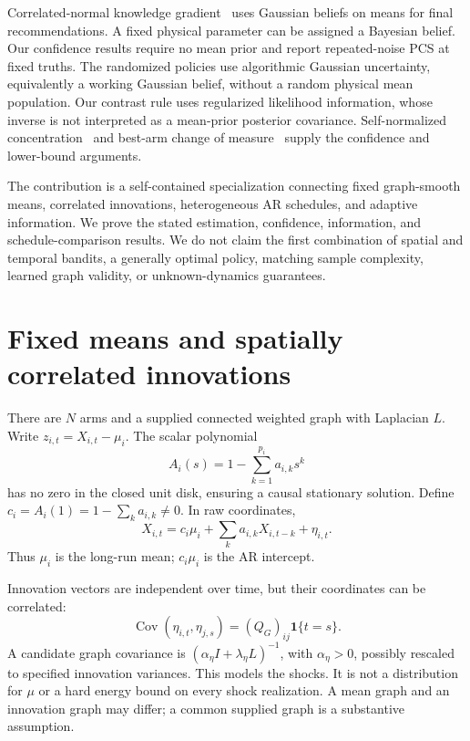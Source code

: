 \documentclass[11pt]{article}
\newcommand{\Cov}{\operatorname{Cov}}
\newcommand{\one}{\mathbf1}
\begin{document}
Correlated-normal knowledge gradient~\cite{frazier2009} uses Gaussian beliefs on means for final recommendations. A fixed physical parameter can be assigned a Bayesian belief. Our confidence results require no mean prior and report repeated-noise PCS at fixed truths. The randomized policies use algorithmic Gaussian uncertainty, equivalently a working Gaussian belief, without a random physical mean population. Our contrast rule uses regularized likelihood information, whose inverse is not interpreted as a mean-prior posterior covariance. Self-normalized concentration~\cite{abbasi2011} and best-arm change of measure~\cite{combes2017,garivier2016} supply the confidence and lower-bound arguments.

The contribution is a self-contained specialization connecting fixed graph-smooth means, correlated innovations, heterogeneous AR schedules, and adaptive information. We prove the stated estimation, confidence, information, and schedule-comparison results. We do not claim the first combination of spatial and temporal bandits, a generally optimal policy, matching sample complexity, learned graph validity, or unknown-dynamics guarantees.

\section{Fixed means and spatially correlated innovations}
There are $N$ arms and a supplied connected weighted graph with Laplacian $L$. Write $z_{i,t}=X_{i,t}-\mu_i$. The scalar polynomial
\[
A_i(s)=1-\sum_{k=1}^{p_i}a_{i,k}s^k
\]
has no zero in the closed unit disk, ensuring a causal stationary solution. Define $c_i=A_i(1)=1-\sum_k a_{i,k}\ne0$. In raw coordinates,
\begin{equation}
X_{i,t}=c_i\mu_i+\sum_k a_{i,k}X_{i,t-k}+\eta_{i,t}.
\end{equation}
Thus $\mu_i$ is the long-run mean; $c_i\mu_i$ is the AR intercept.

Innovation vectors are independent over time, but their coordinates can be correlated:
\begin{equation}
\Cov(\eta_{i,t},\eta_{j,s})=(Q_G)_{ij}\one\{t=s\}.
\end{equation}
A candidate graph covariance is $(\alpha_\eta I+\lambda_\eta L)^{-1}$, with $\alpha_\eta>0$, possibly rescaled to specified innovation variances. This models the shocks. It is not a distribution for $\mu$ or a hard energy bound on every shock realization. A mean graph and an innovation graph may differ; a common supplied graph is a substantive assumption.
\end{document}

